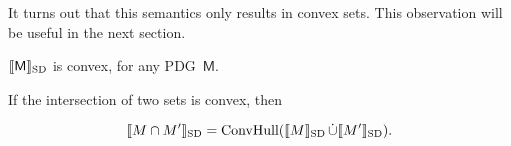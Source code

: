 \documentclass{article}
\newcommand\SD{_{\text{SD}}}
\newcommand{\sfM}{\mathsf M}
\newcommand{\MN}{PDG}
\newcommand{\MNs}{\MN s}
\numberwithin{equation}{section}
\begin{document}
\begin{notfocus}




	
	
	It turns out that this semantics only results in convex sets. This observation will be useful in the next section.

	\begin{lemma}[restate=thmsetconvex] 
		\label{prop:convex}
		$\bbr{\sfM}\SD$ is convex, for any \MN\ $\sfM$.
	\end{lemma}%


	\begin{vfull}
	If the intersection of two sets is convex, then 
	\begin{conj}\label{prop:intersect-set-semantics}
		$$\bbr{M \cap M'}\SD = \text{ConvHull}(\bbr{M}\SD \mathop{\dot\cup} \bbr{M'}\SD).$$
	\end{conj}
	\end{vfull}
	





\end{notfocus}
\end{document}
